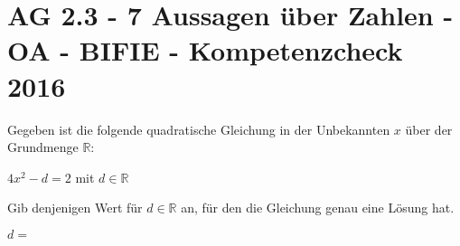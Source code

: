 \section{AG 2.3 - 7 Aussagen über Zahlen - OA - BIFIE - Kompetenzcheck 2016}

\begin{beispiel}[AG 2.3]{1} %
				Gegeben ist die folgende quadratische Gleichung in der Unbekannten $x$ über der Grundmenge $\mathbb{R}$:
\begin{center}
$4x^2-d=2$ mit $d\in\mathbb{R}$
\end{center}

Gib denjenigen Wert für $d\in\mathbb{R}$ an, für den die Gleichung genau eine Lösung hat.


$d=$ 

\end{beispiel}	